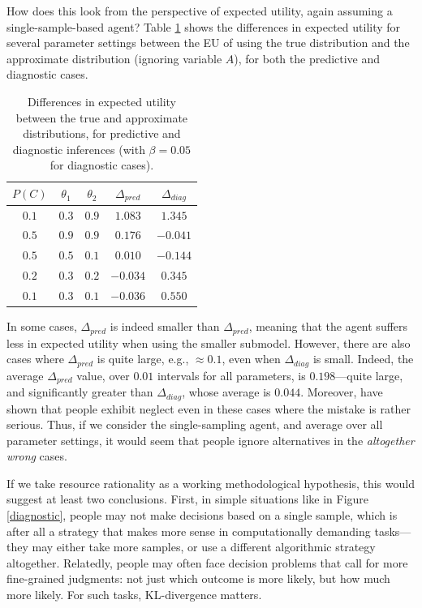 \documentclass[10pt,letterpaper]{article}
\begin{document}
How does this look from the perspective of expected utility, again assuming a single-sample-based agent?  Table \ref{predictive} shows the differences in expected utility for several parameter settings between the EU of using the true distribution and the approximate distribution (ignoring variable $A$), for both the predictive and diagnostic cases. 
\begin{table}[h]  \begin{center}
\begin{tabular}{c | c | c || c | c}
 $P(C)$ & $\theta_1$ & $\theta_2$ & $\Delta_{pred}$ & $\Delta_{diag}$ \\ \hline
  $0.1$ & $0.3$ & $0.9$ & $1.083$ & $1.345$ \\
 $0.5$ & $0.9$ &  $0.9$ & $0.176$ & $-0.041$ \\
 $0.5$ & $0.5$ & $0.1$ & $0.010$ & $-0.144$ \\
  $0.2$ & $0.3$ & $0.2$ & $-0.034$ & $0.345$ \\
 $0.1$ & $0.3$ & $0.1$ & $-0.036$ & $0.550$ \\

\end{tabular} \end{center} \caption{Differences in expected utility between the true and approximate distributions, for predictive and diagnostic inferences (with $\beta = 0.05$ for diagnostic cases).} \label{predictive}
\end{table} 
In some cases, $\Delta_{pred}$ is indeed smaller than $\Delta_{pred}$, meaning that the agent suffers less in expected utility when using the smaller submodel. However, there are also cases where $\Delta_{pred}$ is quite large, e.g., $\approx 0.1$, even when $\Delta_{diag}$ is small. Indeed, the average $\Delta_{pred}$ value, over $0.01$ intervals for all parameters, is $0.198$---quite large, and significantly greater than $\Delta_{diag}$, whose average is $0.044$. Moreover, \cite{Fernbach2013} have shown that people exhibit neglect even in these cases where the mistake is rather serious. Thus, if we consider the single-sampling agent, and average over all parameter settings, it would seem that people ignore alternatives in the \emph{altogether wrong} cases.


If we take resource rationality as a working methodological hypothesis, this would suggest at least two conclusions. First, in simple situations like in Figure \ref{diagnostic}, people may not make decisions based on a single sample, which is after all a strategy that makes more sense in computationally demanding tasks---they may either take more samples, or use a different algorithmic strategy altogether. Relatedly, people may often face decision problems that call for more fine-grained judgments: not just which outcome is more likely, but how much more likely. For such tasks, KL-divergence matters.
\end{document}
